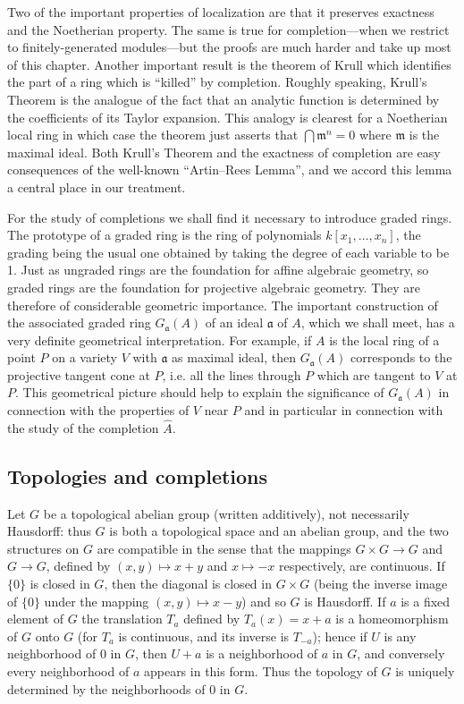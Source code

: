Two of the important properties of localization are that it preserves exactness and the Noetherian property. The same is true for completion---when we restrict to finitely-generated modules---but the proofs are much harder and take up most of this chapter. Another important result is the theorem of Krull which identifies the part of a ring which is ``killed'' by completion. Roughly speaking, Krull's Theorem is the analogue of the fact that an analytic function is determined by the coefficients of its Taylor expansion. This analogy is clearest for a Noetherian local ring in which case the theorem just asserts that $\bigcap\mathfrak m^n=0$ where $\mathfrak m$ is the maximal ideal. Both Krull's Theorem and the exactness of completion are easy consequences of the well-known ``Artin--Rees Lemma'', and we accord this lemma a central place in our treatment.

For the study of completions we shall find it necessary to introduce graded rings. The prototype of a graded ring is the ring of polynomials $k[x_1,\ldots,x_n]$, the grading being the usual one obtained by taking the degree of each variable to be 1. Just as ungraded rings are the foundation for affine algebraic geometry, so graded rings are the foundation for projective algebraic geometry. They are therefore of considerable geometric importance. The important construction of the associated graded ring $G_{\mathfrak a}(A)$ of an ideal $\mathfrak a$ of $A$, which we shall meet, has a very definite geometrical interpretation. For example, if $A$ is the local ring of a point $P$ on a variety $V$ with $\mathfrak a$ as maximal ideal, then $G_{\mathfrak a}(A)$ corresponds to the projective tangent cone at $P$, i.e. all the lines through $P$ which are tangent to $V$ at $P$. This geometrical picture should help to explain the significance of $G_{\mathfrak a}(A)$ in connection with the properties of $V$ near $P$ and in particular in connection with the study of the completion $\widehat A$.

\subsection{Topologies and completions}

Let $G$ be a topological abelian group (written additively), not necessarily Hausdorff: thus $G$ is both a topological space and an abelian group, and the two structures on $G$ are compatible in the sense that the mappings $G\times G\longrightarrow G$ and $G\longrightarrow G$, defined by $(x,y)\mapsto x+y$ and $x\mapsto-x$ respectively, are continuous. If $\{0\}$ is closed in $G$, then the diagonal is closed in $G\times G$ (being the inverse image of $\{0\}$ under the mapping $(x,y)\mapsto x-y$) and so $G$ is Hausdorff. If $a$ is a fixed element of $G$ the translation $T_a$ defined by $T_a(x)=x+a$ is a homeomorphism of $G$ onto $G$ (for $T_a$ is continuous, and its inverse is $T_{-a}$); hence if $U$ is any neighborhood of $0$ in $G$, then $U+a$ is a neighborhood of $a$ in $G$, and conversely every neighborhood of $a$ appears in this form. Thus the topology of $G$ is uniquely determined by the neighborhoods of $0$ in $G$.

